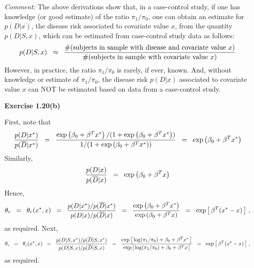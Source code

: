 \vskip 0.5cm
\noindent
\textit{Comment:}\quad
The above derivations show that, in a case-control study, if one has knowledge (or good estimate)
of the ratio $\pi_{1}/\pi_{0}$, one can obtain an estimate for $p(D \vert x)$, the disease risk
associated to covariate value $x$, from the quantity $p(D \vert S,x)$, which can be estimated from
case-control study data as follows:
\begin{equation*}
p(D \vert S,x) \;\; \approx \;\;
\dfrac
{\#\textnormal{(subjects in sample with disease and covariate value $x$)}}
{\#\textnormal{(subjects in sample with covariate value $x$)}}
\end{equation*}
However, in practice, the ratio $\pi_{1}/\pi_{0}$ is rarely, if ever, known.
And, without knowledge or estimate of $\pi_{1}/\pi_{0}$, the disease risk $p(D \vert x)$ associated
to covariate value $x$ can NOT be estimated based on data from a case-control study.

\vskip 1.0cm
\noindent
\textbf{Exercise 1.20(b)}

\vskip 0.5cm
\noindent
First, note that
\begin{equation*}
            \dfrac{p(D \vert x^{*})}{p(\overline{D} \vert x^{*})}
\;\; = \;\; \dfrac{\exp\left(\beta_{0}+\beta^{T}x^{*}\right)/(1 + \exp\left(\beta_{0}+\beta^{T}x^{*}\right))}{1 / (1 + \exp\left(\beta_{0}+\beta^{T}x^{*}\right))}
\;\; = \;\; \exp\left(\beta_{0}+\beta^{T}x^{*}\right)
\end{equation*}
Similarly,
\begin{equation*}
\dfrac{p(D \vert x)}{p(\overline{D} \vert x)}
\;\; = \;\; \exp\left(\beta_{0}+\beta^{T}x\right)
\end{equation*}
Hence,
\begin{equation*}
\theta_{r}
\;\; = \;\;
\theta_{r}(x^{*},x)
\;\; = \;\;
\dfrac{
p(D \vert x^{*}) / p(\overline{D} \vert x^{*})
}{
p(D \vert x) / p(\overline{D} \vert x)
}
\;\; = \;\; \dfrac{\exp\left(\beta_{0}+\beta^{T}x^{*}\right)}{\exp\left(\beta_{0}+\beta^{T}x\right)}
\;\; = \;\; \exp\left[\,\beta^{T}(x^{*} - x)\,\right]\,,
\end{equation*}
as required.
Next,
\begin{equation*}
\theta_{c}
\;\; = \;\;
\theta_{c}(x^{*},x)
\;\; = \;\;
\dfrac{
p(D \vert S,x^{*}) / p(\overline{D} \vert S,x^{*})
}{
p(D \vert S,x) / p(\overline{D} \vert S,x)
}
\;\; = \;\; \dfrac{\exp\left[\,\log(\pi_{1}/\pi_{0})+\beta_{0}+\beta^{T}x^{*}\,\right]}{\exp\left[\,\log(\pi_{1}/\pi_{0})+\beta_{0}+\beta^{T}x\,\right]}
\;\; = \;\; \exp\left[\,\beta^{T}(x^{*} - x)\,\right]\,,
\end{equation*}
as required.

